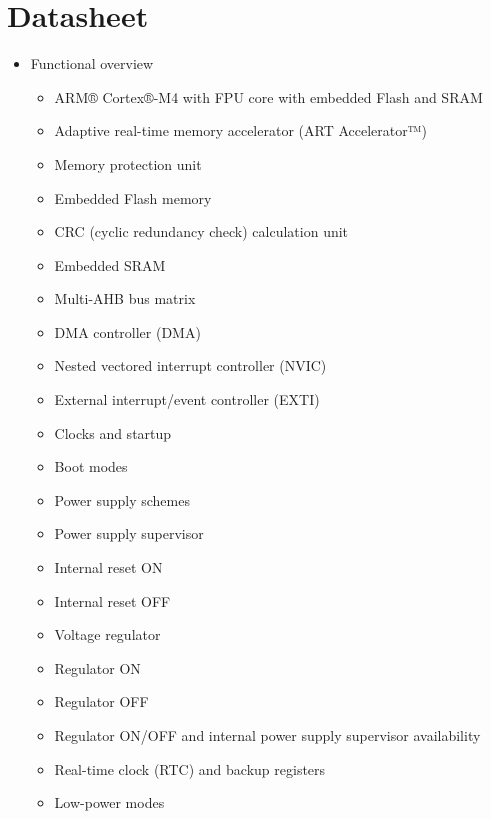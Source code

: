 \documentclass{article}
\begin{document}
\tableofcontents

\section*{Datasheet}

\setcounter{tocdepth}{2}

\begin{itemize}
    \item Functional overview 
    \begin{itemize}
        \item ARM® Cortex®-M4 with FPU core with embedded Flash and SRAM 
        \item Adaptive real-time memory accelerator (ART Accelerator™) 
        \item Memory protection unit 
        \item Embedded Flash memory 
        \item CRC (cyclic redundancy check) calculation unit 
        \item Embedded SRAM 
        \item Multi-AHB bus matrix 
        \item DMA controller (DMA) 
        \item Nested vectored interrupt controller (NVIC) 
        \item External interrupt/event controller (EXTI) 
        \item Clocks and startup 
        \item Boot modes 
        \item Power supply schemes 
        \item Power supply supervisor 
        \item Internal reset ON 
        \item Internal reset OFF 
        \item Voltage regulator 
        \item Regulator ON 
        \item Regulator OFF 
        \item Regulator ON/OFF and internal power supply supervisor availability 
        \item Real-time clock (RTC) and backup registers 
        \item Low-power modes 

\end{itemize}
\end{itemize}
\end{document}
